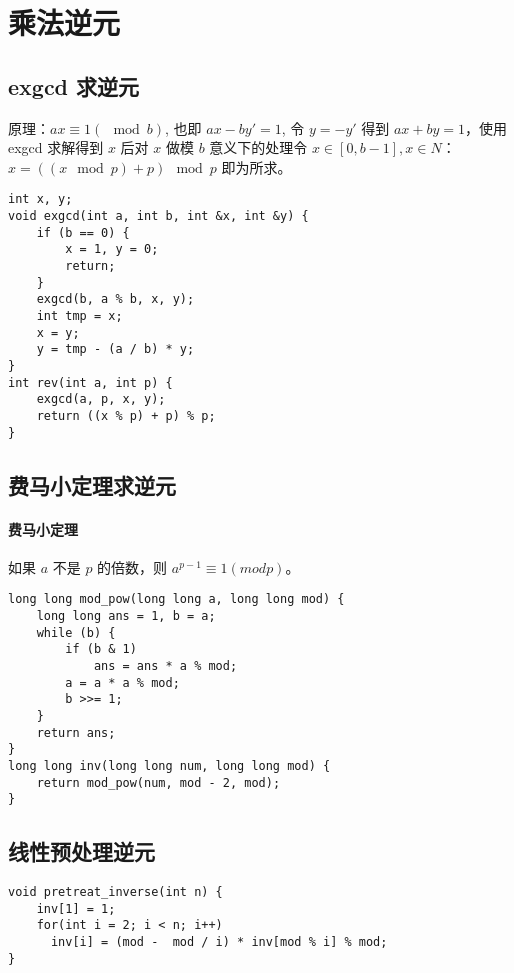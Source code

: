\section{乘法逆元}
\subsection{exgcd 求逆元}
原理：$ax \equiv 1 (\mod{b})$, 也即 $ax - by' = 1$, 令 $y = -y'$ 得到 $ax + by = 1$，使用 exgcd 求解得到 $x$ 后对 $x$ 做模 $b$ 意义下的处理令 $x \in [0, b-1], x \in N$：$x=((x \mod{p}) + p) \mod{p}$ 即为所求。
\begin{verbatim}
int x, y;
void exgcd(int a, int b, int &x, int &y) {
    if (b == 0) {
        x = 1, y = 0;
        return;
    }
    exgcd(b, a % b, x, y);
    int tmp = x;
    x = y;
    y = tmp - (a / b) * y;
}
int rev(int a, int p) {
    exgcd(a, p, x, y);
    return ((x % p) + p) % p;
}
\end{verbatim}

\subsection{费马小定理求逆元}

\paragraph{费马小定理} 如果 $a$ 不是 $p$ 的倍数，则 $a^{p-1} \equiv 1 (mod p)$。

\begin{verbatim}
long long mod_pow(long long a, long long mod) {
    long long ans = 1, b = a;
    while (b) {
        if (b & 1)
            ans = ans * a % mod;
        a = a * a % mod;
        b >>= 1;
    }
    return ans;
}
long long inv(long long num, long long mod) {
    return mod_pow(num, mod - 2, mod);
}
\end{verbatim}

\subsection{线性预处理逆元}

\begin{verbatim}
void pretreat_inverse(int n) {
    inv[1] = 1;
    for(int i = 2; i < n; i++)
      inv[i] = (mod -  mod / i) * inv[mod % i] % mod;
}
\end{verbatim}